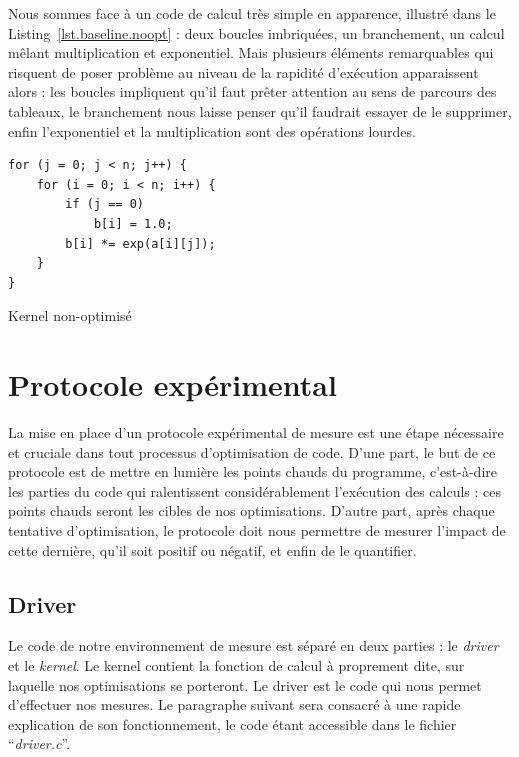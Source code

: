 \documentclass[12pt,a4paper]{article}
\begin{document}
Nous sommes face à un code de calcul très simple en apparence, illustré dans le
Listing~\ref{lst.baseline.noopt} : deux boucles imbriquées, un branchement, un
calcul mêlant multiplication et exponentiel. Mais plusieurs éléments remarquables qui
risquent de poser problème au niveau de la rapidité d'exécution apparaissent
alors : les boucles impliquent qu'il faut prêter attention au sens de parcours
des tableaux, le branchement nous laisse penser qu'il faudrait essayer de le
supprimer, enfin l'exponentiel et la multiplication sont des opérations lourdes.

\begin{listing}[h]
    \begin{verbatim}
for (j = 0; j < n; j++) {
    for (i = 0; i < n; i++) {
        if (j == 0)
            b[i] = 1.0;
        b[i] *= exp(a[i][j]);
    }
}
    \end{verbatim}
    \caption{Kernel non-optimisé}
    \label{lst.baseline.noopt}
\end{listing}

\section{Protocole expérimental}

La mise en place d'un protocole expérimental de mesure est une étape nécessaire
et cruciale dans tout processus d'optimisation de code. D'une part, le but de ce
protocole est de mettre en lumière les points chauds du programme, c'est-à-dire
les parties du code qui ralentissent considérablement l'exécution des calculs :
ces points chauds seront les cibles de nos optimisations. D'autre part, après
chaque tentative d'optimisation, le protocole doit nous permettre de mesurer
l'impact de cette dernière, qu'il soit positif ou négatif, et enfin de le
quantifier.

\subsection{Driver}

Le code de notre environnement de mesure est séparé en deux parties : le \textit{driver}
et le \textit{kernel}. Le kernel contient la fonction de calcul à proprement
dite, sur laquelle nos optimisations se porteront. Le driver est le code qui
nous permet d'effectuer nos mesures. Le paragraphe suivant sera consacré à une
rapide explication de son fonctionnement, le code étant accessible dans le fichier
\enquote{\textit{driver.c}}.
\end{document}
